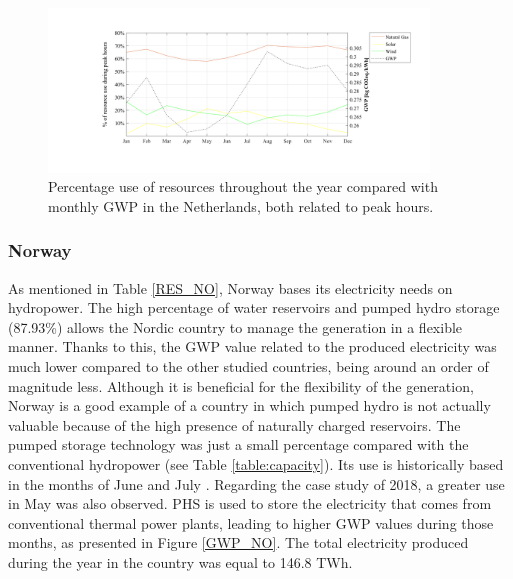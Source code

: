 {\begin{figure}[]
	\centering
	\includegraphics[width=0.9\textwidth]{ChapterLCA/Images/GWP_plots/Comp_GWP_NL.png}
		\vspace*{-8mm}
	\caption{Percentage use of resources throughout the year compared with monthly GWP in the Netherlands, both related to peak hours.}
	
	\label{COMP_NL}
\end{figure}


 

\subsubsection{Norway}
As mentioned in Table \ref{RES_NO}, Norway bases its electricity needs on hydropower. The high percentage of water reservoirs and pumped hydro storage {(87.93\%)} allows the Nordic country to manage the generation in a flexible manner.  Thanks to this, the GWP value related to the produced electricity was much lower compared to the other studied countries, {being around an order of magnitude less}. Although it is beneficial for the flexibility of the generation, Norway is a good example of a country in which pumped hydro is not actually valuable because of the high presence of naturally charged reservoirs. The pumped storage technology was just a small percentage compared with the conventional hydropower (see Table \ref{table:capacity}). Its use is historically based in the months of June and July \cite{Kougias2017PumpedHorse}. Regarding the case study of 2018, a greater use in May was also observed. PHS is used to store the electricity that comes from conventional thermal power plants, leading to higher GWP values during those months, as presented in Figure \ref{GWP_NO}. The total electricity produced during the year in the country was equal to 146.8 TWh.

 \begin{table}[]
\centering
\caption{Percentage of resources used during peak and off-peak hours in Norway \cite{Entso-eProduction}.}
\label{RES_NO} 
\end{table}


}
